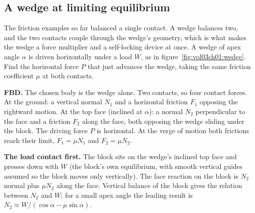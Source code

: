\subsection{A wedge at limiting equilibrium}



The friction examples so far balanced a single contact. A wedge balances
two, and the two contacts couple through the wedge's geometry, which is
what makes the wedge a force multiplier and a self-locking device at once.
A wedge of apex angle $\alpha$ is driven horizontally under a load $W$, as
in figure~\ref{fig:vol03ch01:wedge}. Find the horizontal force $P$ that
just advances the wedge, taking the same friction coefficient $\mu$ at
both contacts.

\textbf{FBD.} The chosen body is the wedge alone. Two contacts, so four
contact forces. At the ground: a vertical normal $N_1$ and a horizontal
friction $F_1$ opposing the rightward motion. At the top face (inclined at
$\alpha$): a normal $N_2$ perpendicular to the face and a friction $F_2$
along the face, both opposing the wedge sliding under the block. The
driving force $P$ is horizontal. At the verge of motion both frictions
reach their limit, $F_1 = \mu N_1$ and $F_2 = \mu N_2$.

\textbf{The load contact first.} The block sits on the wedge's inclined
top face and presses down with $W$ (the block's own equilibrium, with
smooth vertical guides assumed so the block moves only vertically). The
face reaction on the block is $N_2$ normal plus $\mu N_2$ along the face.
Vertical balance of the block gives the relation between $N_2$ and $W$;
for a small apex angle the leading result is $N_2 \approx W / (\cos\alpha
- \mu\sin\alpha)$.

